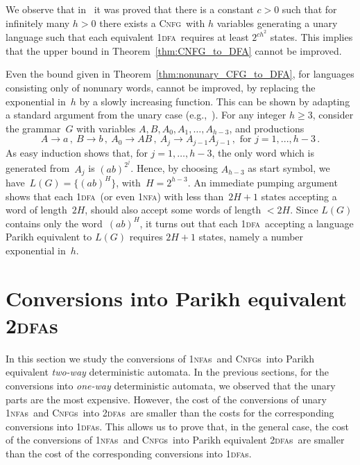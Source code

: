 \documentclass[11pt]{article}
\newcommand*{\tw}{\textsc{2}}
\newcommand*{\twdfa}{\tw\textsc{dfa}}
\newcommand*{\twdfas}{\tw\textsc{dfa}s}
\newcommand*{\ow}{\textsc{1}}
\newcommand*{\owdfa}{\ow\textsc{dfa}}
\newcommand*{\owdfas}{\ow\textsc{dfa}s}
\newcommand*{\ownfa}{\ow\textsc{nfa}}
\newcommand*{\ownfas}{\ow\textsc{nfa}s}
\newcommand*{\cnfg}{\textsc{Cnfg}}
\newcommand*{\cnfgs}{\textsc{Cnfg}s}
\begin{document}
\smallskip
We observe that in~\cite[Thm.\ 7]{PighizziniShallitWang2002} it was proved that there is a constant
$c>0$ such that for infinitely many $h>0$ there exists a \cnfg\ with $h$ variables generating a unary
language such that each equivalent \owdfa\ requires at least $2^{ch^2}$ states. This implies that the upper bound
in Theorem~\ref{thm:CNFG_to_DFA} cannot be improved.

\smallskip

Even the bound given in Theorem~\ref{thm:nonunary_CFG_to_DFA}, for languages consisting only
of nonunary words, cannot be improved, by replacing the exponential in~$h$ by a slowly increasing
function. 
This can be shown by adapting a standard argument from the unary case 
(e.g.,~\cite[Thm.~5]{PighizziniShallitWang2002}).
For any integer $h\ge 3$, consider the grammar~$G$ with variables $A,B,A_0,A_1,\ldots,A_{h-3}$,
and productions
\[
A\rightarrow a\,,~ B\rightarrow b\,,~ A_0\rightarrow AB\,,~ A_j\rightarrow A_{j-1}A_{j-1}\,,\mbox { for $j=1,...,h-3$}
\,.
\]
As easy induction shows that, for $j=1,\ldots,h-3$, the only word which is generated from~$A_j$
is $(ab)^{2^j}$. 
Hence, by choosing $A_{h-3}$ as start symbol, we have~$L(G)=\{(ab)^H\}$, with~$H=2^{h-3}$. 
An immediate pumping argument shows that each \owdfa\ (or even \ownfa) with
less than~$2H+1$ states accepting a word of length~$2H$, should also  accept some
words of length $<2H$. Since $L(G)$ contains only the word~$(ab)^H$, it turns out that each 
\owdfa\ accepting a language Parikh equivalent to $L(G)$ requires
$2H+1$ states, namely a number exponential in~$h$.



\section{Conversions into Parikh equivalent \mbox{\sc\twdfa}s}
	\label{sec:to_2DFA}


In this section we study the conversions of \ownfas\ and \cnfgs\ into Parikh equivalent
\emph{two-way} deterministic automata.
In the previous sections, for the conversions into \emph{one-way} deterministic automata,
we observed that the unary parts are the most expensive. However, the cost
of the conversions of unary \ownfas\ and \cnfgs\ into \twdfas\ are smaller than the costs for
the corresponding conversions into \owdfas. 
This allows us to prove that, in the general case, the cost of the conversions
of  \ownfas\ and \cnfgs\ into Parikh equivalent \twdfas\ are smaller
than the cost of the corresponding conversions into \owdfas.
\end{document}
